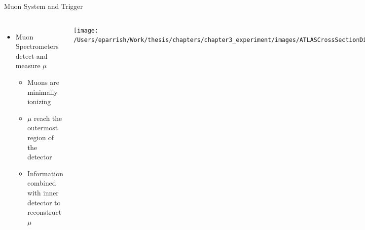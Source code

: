 \documentclass[aspectratio=169,xcolor=table]{beamer}
\begin{document}
    \begin{frame}[t]{Muon System and Trigger}
     \begin{columns}[t]
        \begin{itemize}
          \item Muon Spectrometers detect and measure $\mu$
          \begin{itemize}
            \item Muons are minimally ionizing
            \item $\mu$ reach the outermost region of the detector
            \item Information combined with inner detector to reconstruct $\mu$
          \end{itemize}
        \end{itemize}

      \vspace{-.4cm}
      \begin{columns}
        \centering
        \texttt{[image: /Users/eparrish/Work/thesis/chapters/chapter3\_experiment/images/ATLASCrossSectionDiagram.png]}
        \centering
        \begin{figure}
          \texttt{[image: /Users/eparrish/Work/thesis/chapters/chapter3\_experiment/images/ATLAS\_Muon\_System\_Run2.png]}
          \caption{\tiny \cite{atlas-schematics}}
        \end{figure}
      \end{columns}

      \centering
      \begin{itemize}
        \item Trigger System
        \begin{itemize}
          \item Need to quickly sort through data and decide if a collision is interesting or not
          \item Mix of hardware and software
        \end{itemize}
      \end{itemize}
        \begin{figure}
          \centering
          \texttt{[image: /Users/eparrish/Work/thesis/chapters/chapter3\_experiment/images/tdaq-run2-schematic2017.png]}
          \caption{\tiny \cite{TDAQ_Diagram}}
        \end{figure}

      \end{columns}
    \end{frame}
\end{document}
